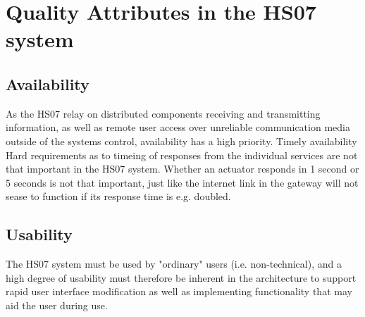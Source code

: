 \documentclass[a4paper,10pt]{article}
\begin{document}
%
%
%


\section{Quality Attributes in the HS07 system}
\subsection{Availability}
As the HS07 relay on distributed components receiving and transmitting information, as well as remote user access over unreliable communication media outside of the systems control, availability has a high priority.
Timely availability
Hard requirements as to timeing of responses from the individual services are not that important in the HS07 system. Whether an actuator responds in 1 second or 5 seconds is not that important, just like the internet link in the gateway will not sease to function if its response time is e.g. doubled.
\subsection{Usability}
The HS07 system must be used by "ordinary" users (i.e. non-technical), and a high degree of usability must therefore be inherent in the architecture to support rapid user interface modification as well as implementing functionality that may aid the user during use.
\end{document}
